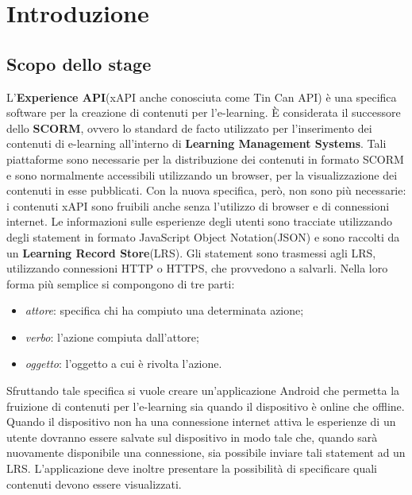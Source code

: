 \documentclass[../Tesi.tex]{subfiles}
\begin{document}
\section{Introduzione}
	
	\subsection{Scopo dello stage}
		L'\textbf{Experience API}(xAPI anche conosciuta come Tin Can API) è una specifica software per la creazione di contenuti per l'e-learning. È considerata il successore dello \textbf{SCORM}, ovvero lo standard de facto utilizzato per l'inserimento dei contenuti di e-learning all'interno di \textbf{Learning Management Systems}. Tali piattaforme sono necessarie per la distribuzione dei contenuti in formato SCORM e sono normalmente accessibili utilizzando un browser, per la visualizzazione dei contenuti in esse pubblicati. Con la nuova specifica, però, non sono più necessarie: i contenuti xAPI sono fruibili anche senza l'utilizzo di browser e di connessioni internet. Le informazioni sulle esperienze degli utenti sono tracciate utilizzando degli statement in formato JavaScript Object Notation(JSON) e sono raccolti da un \textbf{Learning Record Store}(LRS). Gli statement sono trasmessi agli LRS, utilizzando connessioni HTTP o HTTPS, che provvedono a salvarli. Nella loro forma più semplice si compongono di tre parti: 
		\begin{itemize}
			\item \textit{attore}: specifica chi ha compiuto una determinata azione;
			\item \textit{verbo}: l'azione compiuta dall'attore;
			\item \textit{oggetto}: l'oggetto a cui è rivolta l'azione.
		\end{itemize}
		Sfruttando tale specifica si vuole creare un'applicazione Android che permetta la fruizione di contenuti per l'e-learning sia quando il dispositivo è online che offline. Quando il dispositivo non ha una connessione internet attiva le esperienze di un utente dovranno essere salvate sul dispositivo in modo tale che, quando sarà nuovamente disponibile una connessione, sia possibile inviare tali statement ad un LRS. L'applicazione deve inoltre presentare la possibilità di specificare quali contenuti devono essere visualizzati.
\end{document}
